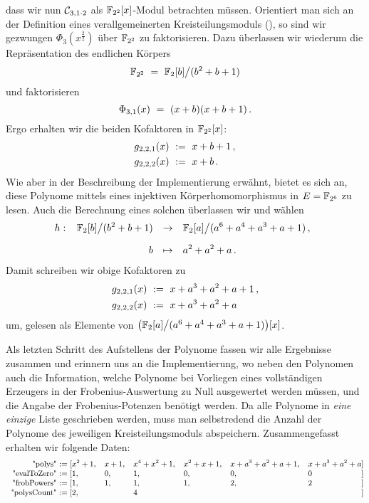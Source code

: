 \begin{enumerate}
\begin{description}
        dass wir nun $\mathcal{C}_{3,1\cdot 2}$ als $\mathbb{F}_{2^2}[x]$-Modul betrachten
        müssen. Orientiert man sich an der Definition eines verallgemeinerten
        Kreisteilungsmoduls (),
        so sind wir gezwungen $\Phi_3(x^{\frac{2}{2}})$ über $\mathbb{F}_{2^2}$ zu
        faktorisieren. Dazu überlassen wir wiederum \sage die Repräsentation
        des endlichen Körpers
        \[ \mathbb{F}_{2^2} \ =\  \mathbb{F}_2[b] \big/ (b^2+b+1)\]
        und faktorisieren
        \[ \Phi_{3,1}(x) \ =\  (x+b) (x+b+1)\,. \]
        Ergo erhalten wir die beiden Kofaktoren in $\mathbb{F}_{2^2}[x]$:
        \begin{align*}
          g_{2,2,1}(x) &\ :=\  x + b+1\,,\\
          g_{2,2,2}(x) &\ :=\  x + b\,.
        \end{align*}
        Wie aber in der Beschreibung der Implementierung erwähnt, bietet es
        sich an, diese Polynome mittels eines injektiven Körperhomomorphismus
        in $E = \mathbb{F}_{2^6}$ zu lesen. Auch die Berechnung eines solchen
        überlassen wir \sage und wählen
        \[ h:\ \funcdef{\F_2[b]\big/(b^2+b+1) &\to& 
          \F_2[a] \big/ ( a^6 + a^4 + a^3 + a + 1 )\,,\\[10pt]
          b &\mapsto& a^2+a^2+a\,.}\]
        Damit schreiben wir obige Kofaktoren zu
        \begin{align*}
          g_{2,2,1}(x) &\ :=\  x + a^3+a^2+a+1\,,\\
          g_{2,2,2}(x) &\ :=\  x + a^3+a^2+a
        \end{align*}
        um, gelesen als Elemente von $\big(\mathbb{F}_2[a]\big/(a^6+a^4+a^3+a+1)\big)[x]$.
    \end{description}
\end{enumerate}
Als letzten Schritt des Aufstellens der Polynome fassen wir alle Ergebnisse
zusammen und erinnern uns an die Implementierung, wo neben den Polynomen auch
die Information, welche Polynome bei Vorliegen eines vollständigen Erzeugers in
der Frobenius-Auswertung zu Null ausgewertet werden müssen, und die Angabe der
Frobenius-Potenzen benötigt werden. Da alle Polynome in \emph{eine einzige}
Liste geschrieben werden, muss man selbstredend die Anzahl der Polynome des
jeweiligen Kreisteilungsmoduls abspeichern. Zusammengefasst erhalten wir
folgende Daten:
\[\small\begin{array}{r@{\ := [}llllll@{]}}
    \text{"polys"} &  x^2+1,& x+1, & x^4+x^2+1, &x^2+x+1, 
      & x+a^3+a^2+a+1, & x+a^3+a^2+a\\
    \text{"evalToZero"} & 1, & 0, & 1, & 0, & 0, & 0\\
    \text{"frobPowers"} & 1, & 1, & 1, & 1, & 2, & 2\\
    \text{"polysCount"} & 2, &    & 4  &    &    &\\
  \end{array}\]
